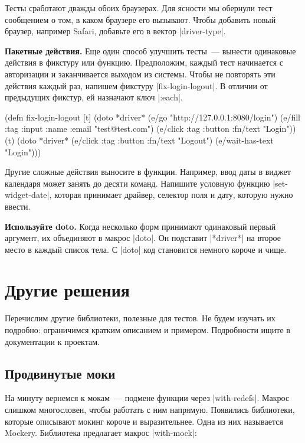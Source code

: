 Тесты сработают дважды обоих браузерах. Для ясности мы обернули тест сообщением
о том, в каком браузере его вызывают. Чтобы добавить новый браузер, например
Safari, добавьте его в вектор \spverb|driver-type|.

\textbf{Пакетные действия.} Еще один способ улучшить тесты~--- вынести
одинаковые действия в фикстуру или функцию. Предположим, каждый тест начинается
с авторизации и заканчивается выходом из системы. Чтобы не повторять эти
действия каждый раз, напишем фикстуру \spverb|fix-login-logout|. В отличии от
предыдущих фикстур, ей назначают ключ \spverb|:each|.

\begin{english}
  \begin{clojure}
(defn fix-login-logout [t]
  (doto *driver*
    (e/go "http://127.0.0.1:8080/login")
    (e/fill {:tag :input :name :email} "test@test.com")
    (e/click {:tag :button :fn/text "Login"}))
  (t)
  (doto *driver*
    (e/click {:tag :button :fn/text "Logout"})
    (e/wait-has-text "Login")))
  \end{clojure}
\end{english}

Другие сложные действия выносите в функции. Например, ввод даты в виджет
календаря может занять до десяти команд. Напишите условную функцию
\spverb|set-widget-date|, которая принимает драйвер, селектор поля и дату,
которую нужно ввести.

\textbf{Используйте doto.} Когда несколько форм принимают одинаковый первый
аргумент, их объединяют в макрос \spverb|doto|. Он подставит \spverb|*driver*|
на второе место в каждый список тела. С \spverb|doto| код становится немного
короче и чище.

\section{Другие решения}

Перечислим другие библиотеки, полезные для тестов. Не будем изучать их подробно:
ограничимся кратким описанием и примером. Подробности ищите в документации к
проектам.

\subsection{Продвинутые моки}

На минуту вернемся к мокам~--- подмене функции через
\spverb|with-redefs|. Макрос слишком многословен, чтобы работать с ним
напрямую. Появились библиотеки, которые описывают мокинг короче и
выразительнее. Одна из них называется Mockery.
Библиотека предлагает макрос \spverb|with-mock|:

